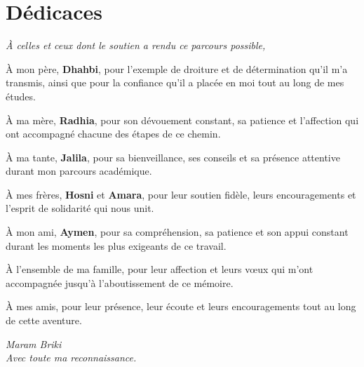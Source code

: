 \chapter*{\textbf{Dédicaces}}
\mtcaddchapter
\thispagestyle{plain}
\singlespacing
\setlength{\parskip}{0.45em}

\begin{center}
\textit{À celles et ceux dont le soutien a rendu ce parcours possible,}
\end{center}

\vspace{0.45cm}

À mon père, \textbf{Dhahbi}, pour l'exemple de droiture et de détermination
qu'il m'a transmis, ainsi que pour la confiance qu'il a placée en moi tout au
long de mes études.

À ma mère, \textbf{Radhia}, pour son dévouement constant, sa patience et
l'affection qui ont accompagné chacune des étapes de ce chemin.

À ma tante, \textbf{Jalila}, pour sa bienveillance, ses conseils et sa
présence attentive durant mon parcours académique.

À mes frères, \textbf{Hosni} et \textbf{Amara}, pour leur soutien fidèle,
leurs encouragements et l'esprit de solidarité qui nous unit.

À mon ami, \textbf{Aymen}, pour sa compréhension, sa patience et
son appui constant durant les moments les plus exigeants de ce travail.

À l'ensemble de ma famille, pour leur affection et leurs vœux qui m'ont
accompagnée jusqu'à l'aboutissement de ce mémoire.

À mes amis, pour leur présence, leur écoute et leurs encouragements tout au
long de cette aventure.

\vspace{0.7cm}
\begin{flushright}
\textit{Maram Briki}\\[2pt]
\textit{Avec toute ma reconnaissance.}
\end{flushright}

\onehalfspacing
\setlength{\parskip}{0.5em plus 0.1em minus 0.1em}

